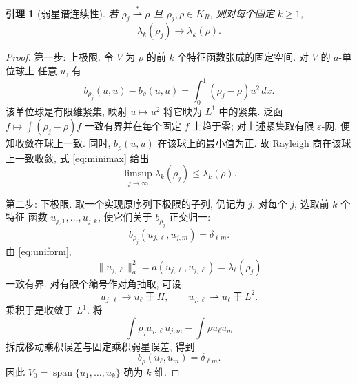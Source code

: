 \documentclass[UTF8]{ctexart}
\newtheorem{lemma}[theorem]{引理}
\begin{document}
\begin{lemma}[弱星谱连续性]\label{lem:wscont}
若 $\rho_j\overset{*}{\rightharpoonup}\rho$ 且 $\rho_j,\rho\in K_R$, 则对每个固定
$k\ge1$,
\begin{equation*}
	\lambda_k(\rho_j)\to\lambda_k(\rho) .
\end{equation*}
\end{lemma}

\begin{proof}
第一步: 上极限. 令 $V$ 为 $\rho$ 的前 $k$ 个特征函数张成的固定空间. 对 $V$ 的 $a$-单位球上
任意 $u$, 有
\begin{equation*}
	b_{\rho_j}(u,u)-b_\rho(u,u)=\int_0^1(\rho_j-\rho)u^2\,dx .
\end{equation*}
该单位球是有限维紧集, 映射 $u\mapsto u^2$ 将它映为 $L^1$ 中的紧集. 泛函
$f\mapsto\int(\rho_j-\rho)f$ 一致有界并在每个固定 $f$ 上趋于零; 对上述紧集取有限
$\varepsilon$-网, 便知收敛在球上一致. 同时, $b_\rho(u,u)$ 在该球上的最小值为正. 故
Rayleigh 商在该球上一致收敛, 式 \eqref{eq:minimax} 给出
\begin{equation}
	\limsup_{j\to\infty}\lambda_k(\rho_j)\le\lambda_k(\rho) .
	\label{eq:limsup}
\end{equation}

第二步: 下极限. 取一个实现原序列下极限的子列, 仍记为 $j$. 对每个 $j$, 选取前 $k$ 个特征
函数 $u_{j,1},\dots,u_{j,k}$, 使它们关于 $b_{\rho_j}$ 正交归一:
\begin{equation*}
	b_{\rho_j}(u_{j,\ell},u_{j,m})=\delta_{\ell m} .
\end{equation*}
由 \eqref{eq:uniform},
\begin{equation*}
	\|u_{j,\ell}\|_a^2=a(u_{j,\ell},u_{j,\ell})=\lambda_\ell(\rho_j)
\end{equation*}
一致有界. 对有限个编号作对角抽取, 可设
\begin{equation}
	u_{j,\ell}\to u_\ell\ \text{于}\ H,\qquad u_{j,\ell}\rightharpoonup u_\ell\ \text{于}\ L^2 .
	\label{eq:conv}
\end{equation}
乘积于是收敛于 $L^1$. 将
\begin{equation*}
	\int\rho_j u_{j,\ell}u_{j,m}-\int\rho u_\ell u_m
\end{equation*}
拆成移动乘积误差与固定乘积弱星误差, 得到
\begin{equation}
	b_\rho(u_\ell,u_m)=\delta_{\ell m} .
	\label{eq:orthlimit}
\end{equation}
因此 $V_0=\operatorname{span}\{u_1,\dots,u_k\}$ 确为 $k$ 维.


\end{proof}
\end{document}
